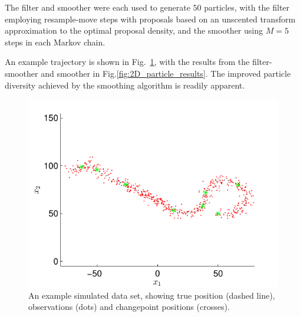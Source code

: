 \documentclass[10pt,twocolumn,twoside]{IEEEtran}
\begin{document}
The filter and smoother were each used to generate $50$ particles, with the filter employing resample-move steps with proposals based on an unscented transform \cite{Julier2004} approximation to the optimal proposal density, and the smoother using $M=5$ steps in each Markov chain.

An example trajectory is shown in Fig.~\ref{fig:simulated_trajectory}, with the results from the filter-smoother and smoother in Fig.\ref{fig:2D_particle_results}. The improved particle diversity achieved by the smoothing algorithm is readily apparent.
%
\begin{figure}[!t]
\centering
\includegraphics[width=0.9\columnwidth]{simulated_problem.pdf}
\caption{An example simulated data set, showing true position (dashed line), observations (dots) and changepoint positions (crosses). }
\label{fig:simulated_trajectory}
\end{figure}
%
\end{document}
